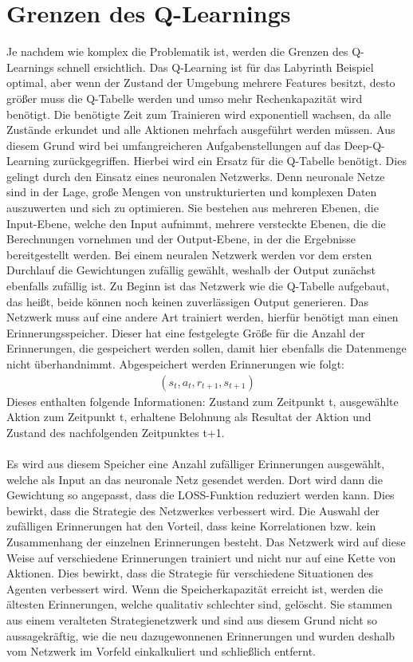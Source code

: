 \documentclass[12pt,titlepage]{article}
\begin{document}
\section{Grenzen des Q-Learnings}
Je nachdem wie komplex die Problematik ist, werden die Grenzen des Q-Learnings schnell ersichtlich. Das Q-Learning ist für das Labyrinth Beispiel optimal, aber wenn der Zustand der Umgebung mehrere Features besitzt, desto größer muss die Q-Tabelle werden und umso mehr Rechenkapazität wird benötigt. Die benötigte Zeit zum Trainieren wird exponentiell wachsen, da alle Zustände erkundet und alle Aktionen mehrfach ausgeführt werden müssen.  Aus diesem Grund wird bei umfangreicheren Aufgabenstellungen auf das Deep-Q-Learning zurückgegriffen. Hierbei wird ein Ersatz für die Q-Tabelle benötigt. Dies gelingt durch den Einsatz eines neuronalen Netzwerks. Denn neuronale Netze sind in der Lage, große Mengen von unstrukturierten und komplexen Daten auszuwerten und sich zu optimieren. 
Sie bestehen aus mehreren Ebenen, die Input-Ebene, welche den Input aufnimmt, mehrere versteckte Ebenen, die die Berechnungen vornehmen und der Output-Ebene, in der die Ergebnisse bereitgestellt werden. Bei einem neuralen Netzwerk werden vor dem ersten Durchlauf die Gewichtungen zufällig gewählt, weshalb der Output zunächst ebenfalls zufällig ist. 
Zu Beginn ist das Netzwerk wie die Q-Tabelle aufgebaut, das heißt, beide können noch keinen zuverlässigen Output generieren.  Das Netzwerk muss auf eine andere Art trainiert werden, hierfür benötigt man einen Erinnerungsspeicher. Dieser hat eine festgelegte Größe für die Anzahl der Erinnerungen, die gespeichert werden sollen, damit hier ebenfalls die Datenmenge nicht überhandnimmt. Abgespeichert werden Erinnerungen wie folgt:
\begin{align*}
(s_t,a_t,r_{t+1},s_{t+1})
\end{align*}
Dieses enthalten folgende Informationen: Zustand zum Zeitpunkt t, ausgewählte Aktion zum Zeitpunkt t, erhaltene Belohnung als Resultat der Aktion und Zustand des nachfolgenden Zeitpunktes t+1.
\\\\
Es wird aus diesem Speicher eine Anzahl zufälliger Erinnerungen ausgewählt, welche als Input an das neuronale Netz gesendet werden. Dort wird dann die Gewichtung so angepasst, dass die LOSS-Funktion reduziert werden kann. Dies bewirkt, dass die Strategie des Netzwerkes verbessert wird. Die Auswahl der zufälligen Erinnerungen hat den Vorteil, dass keine Korrelationen bzw. kein Zusammenhang der einzelnen Erinnerungen besteht. Das Netzwerk wird auf diese Weise auf verschiedene Erinnerungen trainiert und nicht nur auf eine Kette von Aktionen. Dies bewirkt, dass die Strategie für verschiedene Situationen des Agenten verbessert wird. Wenn die Speicherkapazität erreicht ist, werden die ältesten Erinnerungen, welche qualitativ schlechter sind, gelöscht. Sie stammen aus einem veralteten Strategienetzwerk und sind aus diesem Grund nicht so aussagekräftig, wie die neu dazugewonnenen Erinnerungen und wurden deshalb vom Netzwerk im Vorfeld einkalkuliert und schließlich entfernt. 
\end{document}
